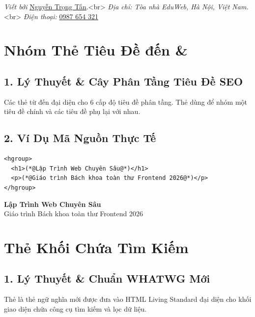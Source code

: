 \begin{browserWindow}
\sffamily\small
\textit{Viết bởi} \textcolor{primaryBlue}{\underline{Nguyễn Trọng Tấn}}.<br>
\textit{Địa chỉ: Tòa nhà EduWeb, Hà Nội, Việt Nam.}<br>
\textit{Điện thoại:} \textcolor{primaryBlue}{\underline{0987 654 321}}
\end{browserWindow}

\section{Nhóm Thẻ Tiêu Đề  đến  \& }
\subsection{1. Lý Thuyết \& Cây Phân Tầng Tiêu Đề SEO}
Các thẻ từ  đến  đại diện cho 6 cấp độ tiêu đề phân tầng. Thẻ  dùng để nhóm một tiêu đề chính và các tiêu đề phụ lại với nhau.

\subsection{2. Ví Dụ Mã Nguồn Thực Tế}
\begin{codeWindow}
\begin{lstlisting}[language=HTML5]
<hgroup>
  <h1>(*@Lập Trình Web Chuyên Sâu@*)</h1>
  <p>(*@Giáo trình Bách khoa toàn thư Frontend 2026@*)</p>
</hgroup>
\end{lstlisting}
\end{codeWindow}

\begin{browserWindow}
\sffamily
{\Huge\bfseries Lập Trình Web Chuyên Sâu}\\[2pt]
{\color{gray!80}\Large Giáo trình Bách khoa toàn thư Frontend 2026}
\end{browserWindow}

\section{Thẻ Khối Chứa Tìm Kiếm }
\subsection{1. Lý Thuyết \& Chuẩn WHATWG Mới}
Thẻ  là thẻ ngữ nghĩa mới được đưa vào HTML Living Standard đại diện cho khối giao diện chứa công cụ tìm kiếm và lọc dữ liệu.

